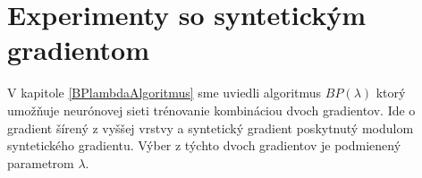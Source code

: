 \newpage
\appendix
{}


\chapter{Experimenty so syntetickým gradientom}
\label{SGexperimets}

V kapitole \ref{BPlambdaAlgoritmus} sme uviedli algoritmus $BP(\lambda)$ ktorý umožňuje neurónovej sieti trénovanie kombináciou dvoch gradientov. Ide o gradient šírený z vyššej vrstvy a syntetický gradient poskytnutý modulom syntetického gradientu. Výber z týchto dvoch gradientov je podmienený parametrom $\lambda$. 

